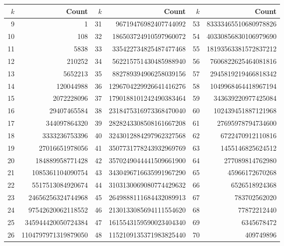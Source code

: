 \documentclass[reqno]{amsart}
\numberwithin{equation}{section}
\begin{document}
\begin{table}[t]
    \centering
    {\footnotesize
    \begin{tabular}{@{}rr@{\hspace{5em}}rr@{\hspace{5em}}rr@{}}
        \toprule
        \textbf{$k$} & \textbf{Count} & \textbf{$k$} & \textbf{Count} & \textbf{$k$} & \textbf{Count} \\ 
        \midrule
        9 & 1 & 31 & 96719476982407744092 & 53 & 83333465510680978826 \\
        10 & 108 & 32 & 186503724910597960072 & 54 & 40330856830106979690 \\
        11 & 5838 & 33 & 335422734825487477468 & 55 & 18193563381572837212 \\
        12 & 210252 & 34 & 562215751430485988940 & 56 & 7606822625464081816 \\
        13 & 5652213 & 35 & 882789394906258039156 & 57 & 2945819219466818342 \\
        14 & 120044988 & 36 & 1296704229926641416276 & 58 & 1049968464418967194 \\
        15 & 2072228096 & 37 & 1790188101242490383464 & 59 & 343639220977425084 \\
        16 & 29407465584 & 38 & 2318475316973368470040 & 60 & 102439451887121968 \\
        17 & 344097864320 & 39 & 2828243308508161667208 & 61 & 27695978794734600 \\
        18 & 3333236753396 & 40 & 3243012884297962327568 & 62 & 6722470912110816 \\
        19 & 27016651978056 & 41 & 3507731778243932969769 & 63 & 1455146825624512 \\
        20 & 184889958771428 & 42 & 3570249044441509661900 & 64 & 277089814762980 \\
        21 & 1085361104090754 & 43 & 3430496716635991967290 & 65 & 45966172670268 \\
        22 & 5517513084920674 & 44 & 3103130069080774429632 & 66 & 6526518924368 \\
        23 & 24656256324744968 & 45 & 2649888111684432089913 & 67 & 783702562020 \\
        24 & 97542620062118552 & 46 & 2130133085694111554620 & 68 & 77872212440 \\
        25 & 345944420050724384 & 47 & 1615543159590023404340 & 69 & 6345678472 \\
        26 & 1104797971319879050 & 48 & 1152109135371983825440 & 70 & 409749896 \\

\end{tabular}}
\end{table}
\end{document}
